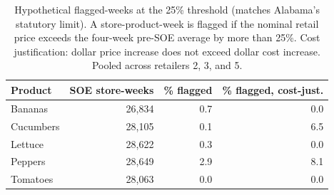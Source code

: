 \begin{table}[!h]
\centering
\caption{\label{tab:tab:flagged_weeks_T25}Hypothetical flagged-weeks at the 25\% threshold (matches Alabama's statutory limit). A store-product-week is flagged if the nominal retail price exceeds the four-week pre-SOE average by more than 25\%. Cost justification: dollar price increase does not exceed dollar cost increase. Pooled across retailers 2, 3, and 5.}
\centering
\begin{tabular}[t]{lrrr}
\toprule
Product & SOE store-weeks & \% flagged & \% flagged, cost-just.\\
\midrule
Bananas & 26,834 & 0.7 & 0.0\\
Cucumbers & 28,105 & 0.1 & 6.5\\
Lettuce & 28,622 & 0.3 & 0.0\\
Peppers & 28,649 & 2.9 & 8.1\\
Tomatoes & 28,063 & 0.0 & 0.0\\
\bottomrule
\end{tabular}
\end{table}

